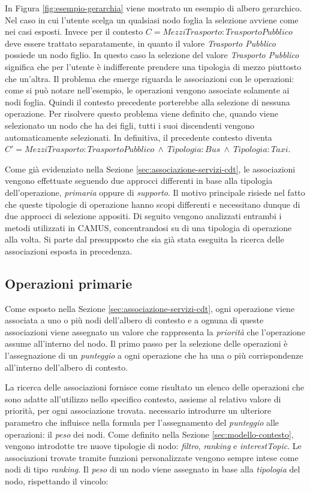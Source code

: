 In Figura \ref{fig:esempio-gerarchia} viene mostrato un esempio di albero gerarchico. Nel caso in cui l'utente scelga un qualsiasi nodo foglia la selezione avviene come nei casi esposti. Invece per il contesto $ C = MezziTrasporto: TrasportoPubblico $ deve essere trattato separatamente, in quanto il valore \emph{Trasporto Pubblico} possiede un nodo figlio. In questo caso la selezione del valore \emph{Trasporto Pubblico} significa che per l'utente è indifferente prendere una tipologia di mezzo piuttosto che un'altra. Il problema che emerge riguarda le associazioni con le operazioni: come si può notare nell'esempio, le operazioni vengono associate solamente ai nodi foglia. Quindi il contesto precedente porterebbe alla selezione di nessuna operazione. Per risolvere questo problema viene definito che, quando viene selezionato un nodo che ha dei figli, tutti i suoi discendenti vengono automaticamente selezionati. In definitiva, il precedente contesto diventa $ C' = MezziTrasporto: TrasportoPubblico\ \land\ Tipologia: Bus\ \land\ Tipologia: Taxi $.

Come già evidenziato nella Sezione \ref{sec:associazione-servizi-cdt}, le associazioni vengono effettuate seguendo due approcci differenti in base alla tipologia dell'operazione, \emph{primaria} oppure di \emph{supporto}. Il motivo principale risiede nel fatto che queste tipologie di operazione hanno scopi differenti e necessitano dunque di due approcci di selezione appositi. Di seguito vengono analizzati entrambi i metodi utilizzati in CAMUS, concentrandosi su di una tipologia di operazione alla volta. Si parte dal presupposto che sia già stata eseguita la ricerca delle associazioni esposta in precedenza.

\subsection*{Operazioni primarie}

Come esposto nella Sezione \ref{sec:associazione-servizi-cdt}, ogni operazione viene associata a uno o più nodi dell'albero di contesto e a ognuna di queste associazioni viene assegnato un valore che rappresenta la \emph{priorità} che l'operazione assume all'interno del nodo. Il primo passo per la selezione delle operazioni è l'assegnazione di un \emph{punteggio} a ogni operazione che ha una o più corrispondenze all'interno dell'albero di contesto. 

La ricerca delle associazioni fornisce come risultato un elenco delle operazioni che sono adatte all'utilizzo nello specifico contesto, assieme al relativo valore di priorità, per ogni associazione trovata. \upe necessario introdurre un ulteriore parametro che influisce nella formula per l'assegnamento del \emph{punteggio} alle operazioni: il \emph{peso} dei nodi. Come definito nella Sezione \ref{sec:modello-contesto}, vengono introdotte tre nuove tipologie di nodo: \emph{filtro}, \emph{ranking} e \emph{interestTopic}. Le associazioni trovate tramite funzioni personalizzate vengono sempre intese come nodi di tipo \emph{ranking}. Il \emph{peso} di un nodo viene assegnato in base alla \emph{tipologia} del nodo, rispettando il vincolo:

